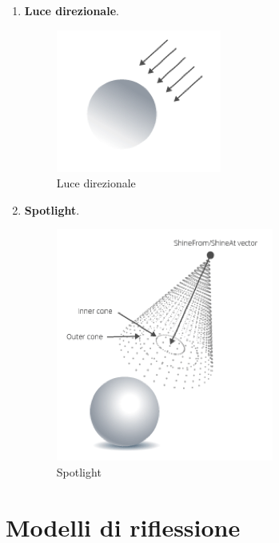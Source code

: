 \documentclass[9pt,a4paper,twoside]{tau}
\begin{document}
\begin{enumerate}
    	\item \textbf{Luce direzionale}. %
    		\begin{figure}[H]
        		\centering
        		\includegraphics[width=0.3\columnwidth]{Figures/03.png}
        		\caption{Luce direzionale}
        		\label{fig:figure}
			\end{figure}
    	\item \textbf{Spotlight}. %
    		\begin{figure}[H]
		        \centering
		        \includegraphics[width=0.3\columnwidth]{Figures/04.png}
		        \caption{Spotlight}
		        \label{fig:figure}
			\end{figure}
\end{enumerate}

\section{Modelli di riflessione}
    
\end{document}
